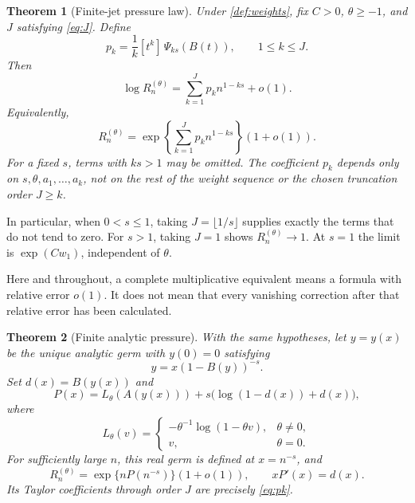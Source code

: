 \documentclass[11pt,a4paper]{article}
\newtheorem{theorem}{Theorem}[section]
\theoremstyle{definition}
\theoremstyle{remark}
\numberwithin{equation}{section}
\begin{document}
\begin{theorem}[Finite-jet pressure law]\label{thm:main}
Under \cref{def:weights}, fix $C>0$, $\theta\ge-1$, and $J$ satisfying
\eqref{eq:J}. Define
\begin{equation}
 p_k=\frac1k[t^k]\,\Psi_{ks}(B(t)),\qquad 1\le k\le J.
 \label{eq:pk}
\end{equation}
Then
\begin{equation}
 \boxed{\displaystyle
 \log R_n^{(\theta)}=\sum_{k=1}^Jp_kn^{1-ks}+o(1).}
 \label{eq:mainlog}
\end{equation}
Equivalently,
\begin{equation}
 R_n^{(\theta)}=
 \exp\left\{\sum_{k=1}^Jp_kn^{1-ks}\right\}(1+o(1)).
 \label{eq:mainmult}
\end{equation}
For a fixed $s$, terms with $ks>1$ may be omitted. The coefficient $p_k$
depends only on $s,\theta,a_1,\ldots,a_k$, not on the rest of the
weight sequence or the chosen truncation order $J\ge k$.
\end{theorem}

In particular, when $0<s\le1$, taking $J=\lfloor1/s\rfloor$ supplies
exactly the terms that do not tend to zero. For $s>1$, taking $J=1$
shows $R_n^{(\theta)}\to1$. At $s=1$ the limit is $\exp(Cw_1)$,
independent of $\theta$.

Here and throughout, a complete multiplicative equivalent means a
formula with relative error $o(1)$. It does not mean that every vanishing
correction after that relative error has been calculated.

\begin{theorem}[Finite analytic pressure]\label{thm:pressure}
With the same hypotheses, let $y=y(x)$ be the unique analytic germ
with $y(0)=0$ satisfying
\begin{equation}
 y=x(1-B(y))^{-s}.
 \label{eq:y}
\end{equation}
Set $d(x)=B(y(x))$ and
\begin{equation}
 P(x)=L_\theta(A(y(x)))
       +s\bigl(\log(1-d(x))+d(x)\bigr),
 \label{eq:pressure}
\end{equation}
where
\begin{equation}
 L_\theta(v)=
 \begin{cases}
 -\theta^{-1}\log(1-\theta v),&\theta\ne0,\\
 v,&\theta=0.
 \end{cases}
 \label{eq:Ltheta}
\end{equation}
For sufficiently large $n$, this real germ is defined at $x=n^{-s}$,
and
\begin{equation}
 R_n^{(\theta)}=\exp\{nP(n^{-s})\}(1+o(1)),
 \qquad xP'(x)=d(x).
 \label{eq:resummed}
\end{equation}
Its Taylor coefficients through order $J$ are precisely \eqref{eq:pk}.
\end{theorem}
\end{document}
